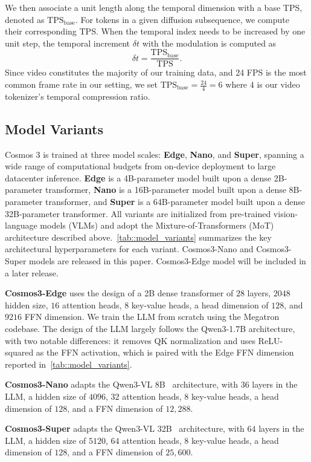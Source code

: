 We then associate a unit length along the temporal dimension with a base TPS, denoted as $\mathrm{TPS}_{\mathrm{base}}$. For tokens in a given diffusion subsequence, we compute their corresponding TPS. When the temporal index needs to be increased by one unit step, the temporal increment $\delta t$ with the modulation is computed as
\begin{equation}
    \delta t = \frac{\mathrm{TPS}_{\mathrm{base}}}{\mathrm{TPS}}.
    \label{eq:fps_modulation}
\end{equation}
Since video constitutes the majority of our training data, and 24 FPS is the most common frame rate in our setting, we set $\mathrm{TPS}_{\mathrm{base}} = \frac{24}{4} = 6$ where $4$ is our video tokenizer's temporal compression ratio.

\subsection{Model Variants}

Cosmos 3 is trained at three model scales: \textbf{Edge}, \textbf{Nano}, and \textbf{Super}, spanning a wide range of computational budgets from on-device deployment to large datacenter inference. \textbf{Edge} is a 4B-parameter model built upon a dense 2B-parameter transformer, \textbf{Nano} is a 16B-parameter model built upon a dense 8B-parameter transformer, and \textbf{Super} is a 64B-parameter model built upon a dense 32B-parameter transformer. All variants are initialized from pre-trained vision-language models (VLMs) and adopt the Mixture-of-Transformers (MoT) architecture described above.~\cref{tab::model_variants} summarizes the key architectural hyperparameters for each variant. Cosmos3-Nano and Cosmos3-Super models are released in this paper. Cosmos3-Edge model will be included in a later release.

\textbf{Cosmos3-Edge} uses the design of a 2B dense transformer of $28$ layers, $2048$ hidden size, $16$ attention heads, $8$ key-value heads, a head dimension of $128$, and $9216$ FFN dimension. We train the LLM from scratch using the Megatron codebase. The design of the LLM largely follows the Qwen3-1.7B architecture, with two notable differences: it removes QK normalization and uses ReLU-squared as the FFN activation, which is paired with the Edge FFN dimension reported in~\cref{tab::model_variants}.

\textbf{Cosmos3-Nano} adapts the Qwen3-VL 8B~\citep{qwen3vl2025} architecture, with $36$ layers in the LLM, a hidden size of $4096$, $32$ attention heads, 8 key-value heads, a head dimension of $128$, and a FFN dimension of $12{,}288$.

\textbf{Cosmos3-Super} adapts the Qwen3-VL 32B~\citep{qwen3vl2025} architecture, with $64$ layers in the LLM, a hidden size of $5120$, $64$ attention heads, $8$ key-value heads, a head dimension of $128$, and a FFN dimension of $25{,}600$.


